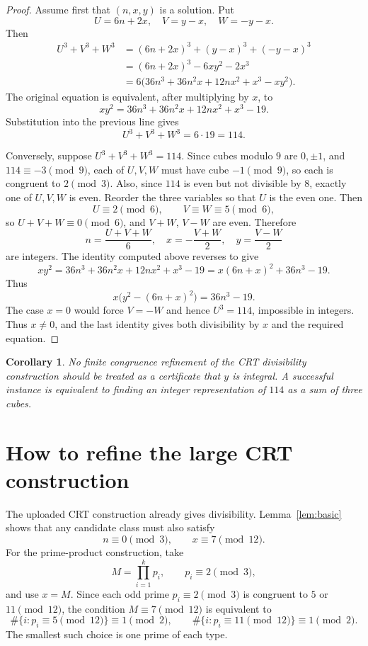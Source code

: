 \documentclass[11pt]{article}
\newtheorem{corollary}{Corollary}
\begin{document}
\begin{proof}
Assume first that \((n,x,y)\) is a solution.  Put
\[
        U=6n+2x,
        \quad V=y-x,
        \quad W=-y-x.
\]
Then
\[
\begin{aligned}
U^3+V^3+W^3
&=(6n+2x)^3+(y-x)^3+(-y-x)^3\\
&=(6n+2x)^3-6xy^2-2x^3\\
&=6\bigl(36n^3+36n^2x+12nx^2+x^3-xy^2\bigr).
\end{aligned}
\]
The original equation is equivalent, after multiplying by \(x\), to
\[
        xy^2=36n^3+36n^2x+12nx^2+x^3-19.
\]
Substitution into the previous line gives
\[
        U^3+V^3+W^3=6\cdot 19=114.
\]

Conversely, suppose \(U^3+V^3+W^3=114\).  Since cubes modulo \(9\) are
\(0,\pm 1\), and \(114\equiv -3\pmod 9\), each of \(U,V,W\) must have cube
\(-1\pmod 9\), so each is congruent to \(2\pmod 3\).  Also, since \(114\) is
even but not divisible by \(8\), exactly one of \(U,V,W\) is even.  Reorder the
three variables so that \(U\) is the even one.  Then
\[
        U\equiv 2\pmod 6,
        \qquad V\equiv W\equiv 5\pmod 6,
\]
so \(U+V+W\equiv 0\pmod 6\), and \(V+W\), \(V-W\) are even.  Therefore
\[
        n=\frac{U+V+W}{6},\quad
        x=-\frac{V+W}{2},\quad
        y=\frac{V-W}{2}
\]
are integers.  The identity computed above reverses to give
\[
        xy^2=36n^3+36n^2x+12nx^2+x^3-19
              =x(6n+x)^2+36n^3-19.
\]
Thus
\[
        x\bigl(y^2-(6n+x)^2\bigr)=36n^3-19.
\]
The case \(x=0\) would force \(V=-W\) and hence \(U^3=114\), impossible in
integers.  Thus \(x\ne 0\), and the last identity gives both divisibility by
\(x\) and the required equation.
\end{proof}

\begin{corollary}\label{cor:notcongruenceonly}
No finite congruence refinement of the CRT divisibility construction should be
treated as a certificate that \(y\) is integral.  A successful instance is
equivalent to finding an integer representation of \(114\) as a sum of three
cubes.
\end{corollary}

\section{How to refine the large CRT construction}
The uploaded CRT construction already gives divisibility.  Lemma~\ref{lem:basic}
shows that any candidate class must also satisfy
\[
        n\equiv 0\pmod 3,
        \qquad x\equiv 7\pmod {12}.
\]
For the prime-product construction, take
\[
        M=\prod_{i=1}^k p_i,
        \qquad p_i\equiv 2\pmod 3,
\]
and use \(x=M\).  Since each odd prime \(p_i\equiv 2\pmod 3\) is congruent to
\(5\) or \(11\pmod {12}\), the condition \(M\equiv 7\pmod {12}\) is equivalent
to
\[
        \#\{i:p_i\equiv 5\pmod {12}\}\equiv 1\pmod 2,
        \qquad
        \#\{i:p_i\equiv 11\pmod {12}\}\equiv 1\pmod 2.
\]
The smallest such choice is one prime of each type.
\end{document}
